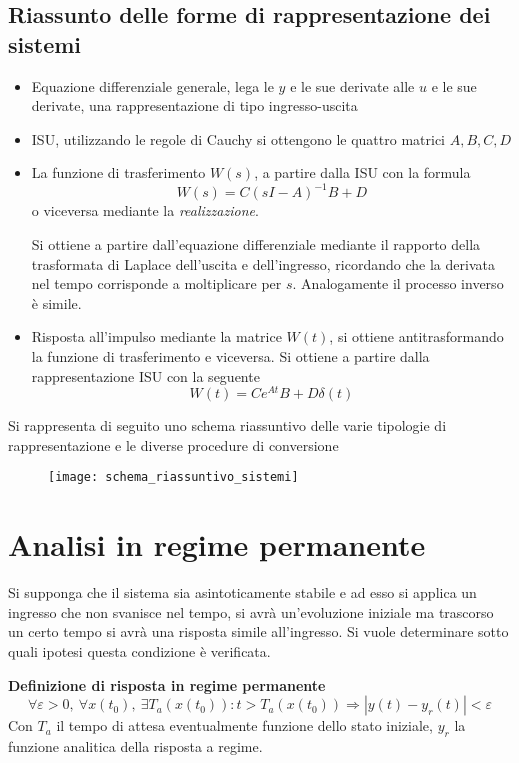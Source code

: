 \newpage
\section{Riassunto delle forme di rappresentazione dei sistemi}
\begin{itemize}
\item Equazione differenziale generale, lega le $y$ e le sue derivate alle $u$
e le sue derivate, una rappresentazione di tipo ingresso-uscita
\item ISU, utilizzando le regole di Cauchy si ottengono le quattro matrici
$A,B,C,D$
\item La funzione di trasferimento $W(s)$, a partire dalla ISU con la formula
$$
W(s) = C(sI-A)^{-1}B + D
$$
o viceversa mediante la \textit{realizzazione}.

Si ottiene a partire dall'equazione differenziale mediante il rapporto della
trasformata di Laplace dell'uscita e dell'ingresso, ricordando che la derivata
nel tempo corrisponde a moltiplicare per $s$.
Analogamente il processo inverso è simile.

\item Risposta all'impulso mediante la matrice $W(t)$, si ottiene
antitrasformando la funzione di trasferimento e viceversa.
Si ottiene a partire dalla rappresentazione ISU con la seguente
$$
W(t) = Ce^{At}B +D\delta(t)
$$
\end{itemize}

Si rappresenta di seguito uno schema riassuntivo delle varie tipologie di
rappresentazione e le diverse procedure di conversione
\begin{figure}[h]
\centering
\texttt{[image: schema\_riassuntivo\_sistemi]}
\end{figure}


\chapter{Analisi in regime permanente}
Si supponga che il sistema sia asintoticamente stabile e ad esso si applica un
ingresso che non svanisce nel tempo, si avrà un'evoluzione iniziale ma
trascorso un certo tempo si avrà una risposta simile all'ingresso.
Si vuole determinare sotto quali ipotesi questa condizione è verificata.

\newpage
\textbf{Definizione di risposta in regime permanente}
$$
\forall \varepsilon>0 ,\ \forall x(t_0),\
\exists T_a\left(x(t_0)\right): t>T_a\left(x(t_0)\right)
\Rightarrow |y(t)-y_r(t)| < \varepsilon
$$
Con $T_a$ il tempo di attesa eventualmente funzione dello stato iniziale, $y_r$
la funzione analitica della risposta a regime.


